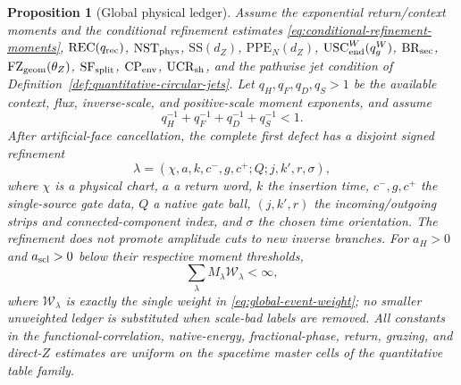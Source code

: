\documentclass[11pt]{article}
\newtheorem{proposition}[theorem]{Proposition}
\begin{document}
\begin{proposition}[Global physical ledger]
\label{prop:global-labelled-ledger}
Assume the exponential return/context moments and the conditional refinement
estimates \eqref{eq:conditional-refinement-moments},
$\mathrm{REC}(q_{\rm rec})$,
$\mathrm{NST}_{\rm phys}$, $\mathrm{SS}(d_Z)$,
$\mathrm{PPE}_{N}(d_Z)$,
$\mathrm{USC}_{\rm end}^{W}(q_g^W)$,
$\mathrm{BR}_{\rm sec}$, $\mathrm{FZ}_{\rm geom}(\theta_Z)$,
$\mathrm{SF}_{\rm split}$, $\mathrm{CP}_{\rm env}$,
$\mathrm{UCR}_{\rm sh}$, and the pathwise jet condition of
Definition~\ref{def:quantitative-circular-jets}.  Let $q_H,q_F,q_D,q_S>1$ be the
available context, flux, inverse-scale, and positive-scale moment exponents,
and assume
\begin{equation}
\label{eq:holder-conjugate-margin}
 q_H^{-1}+q_F^{-1}+q_D^{-1}+q_S^{-1}<1.
\end{equation}
After artificial-face cancellation, the complete first defect has a disjoint
signed refinement
\begin{equation}
\label{eq:global-label}
 \lambda=(\chi,a,k,c^-,g,c^+;Q;j,k',r,\sigma),
\end{equation}
where $\chi$ is a physical chart, $a$ a return word, $k$ the insertion time,
$c^-,g,c^+$ the single-source gate data, $Q$ a native gate ball,
$(j,k',r)$ the incoming/outgoing strips and connected-component index, and
$\sigma$ the chosen time orientation.  The refinement does not promote
amplitude cuts to new inverse branches.  For $a_H>0$ and $a_{\rm scl}>0$
below their respective moment thresholds,
\begin{equation}
\label{eq:global-ledger-sum}
 \sum_\lambda M_\lambda\mathscr W_\lambda<\infty,
\end{equation}
where $\mathscr W_\lambda$ is exactly the single weight in
\eqref{eq:global-event-weight}; no smaller unweighted ledger is substituted
when scale-bad labels are removed.
All constants in the functional-correlation, native-energy,
fractional-phase, return, grazing, and direct-$Z$ estimates are uniform on
the spacetime master cells of the quantitative table family.
\end{proposition}
\end{document}
